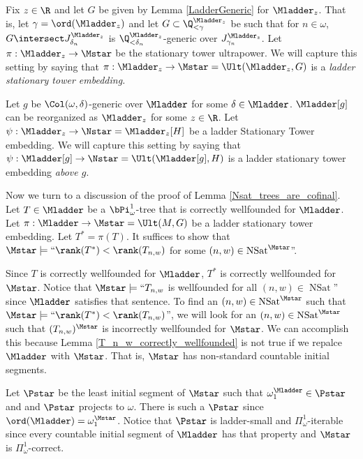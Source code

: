 \documentclass[oneside,12pt]{amsart}
\DeclareMathOperator{\NSat}{NSat}
\begin{document}
\begin{definition}
Fix $z\in\R$ and let $G$ be given by Lemma \ref{LadderGeneric} for $\Mladder_z$. That is,
let $\gamma=\ord(\Mladder_z)$ and let $G\subset \Q_{<\gamma}^{\Mladder_z}$ be such that for
$n\in\omega$, $G\intersect J^{\Mladder_z}_{\delta_n}$ is
$\Q_{<\delta_n}^{\Mladder_z}$-generic over $J^{\Mladder_z}_{\gamma_n}$.
Let $\pi:\Mladder_z\to\Mstar$ be the stationary tower ultrapower.
We will capture this setting by saying that  $\pi:\Mladder_z\to\Mstar=\Ult(\Mladder_z,G)$
is a \emph{ladder stationary tower embedding.}

Let $g$ be $\Col(\omega,\delta)$-generic over $\Mladder$ for some
$\delta\in\Mladder$.
$\Mladder[g]$ can be reorganized as $\Mladder_z$ for some $z\in\R$.
Let $\psi:\Mladder_z\to\Nstar=\Mladder_z[H]$ be a ladder Stationary Tower embedding.
We will capture this setting by saying that
$\psi:\Mladder[g]\to\Nstar=\Ult(\Mladder[g],H)$ is a ladder stationary tower embedding \emph{above $g$}.
\end{definition}

Now we turn to a discussion of the proof of Lemma \ref{Nsat_trees_are_cofinal}.
Let $T\in\Mladder$ be a $\bPi^1_{\omega}$-tree that is correctly wellfounded for $\Mladder$.
Let $\pi:\Mladder\to\Mstar=\Ult(M,G)$ be a ladder stationary tower embedding.
Let $T^* = \pi(T)$. It suffices to show that
$\Mstar\models\text{``}\rank(T^*) < \rank(T_{n,w})$ for some $(n,w)\in \NSat^{\Mstar}$''.

Since $T$ is correctly wellfounded for $\Mladder$, $T^*$ is correctly wellfounded for $\Mstar$.
Notice that $\Mstar\models\text{``}T_{n,w}$ is wellfounded for all $(n,w)\in \NSat$''
since $\Mladder$ satisfies that sentence. To find an $(n,w)\in \NSat^{\Mstar}$ such that
$\Mstar\models\text{``}\rank(T^*) < \rank(T_{n,w})$'', we will look for an
$(n,w)\in \NSat^{\Mstar}$
such that $(T_{n,w})^{\Mstar}$ is incorrectly wellfounded for $\Mstar$.
We can accomplish this because Lemma \ref{T_n_w_correctly_wellfounded} is not
true if we repalce $\Mladder$ with $\Mstar$. That is, $\Mstar$ has non-standard
countable initial segments.

Let $\Pstar$ be the least initial segment of $\Mstar$ such that
$\omega_1^{\Mladder}\in\Pstar$ and
and $\Pstar$ projects to $\omega$. There is such a $\Pstar$ since
$\ord(\Mladder)=\omega_1^{\Mstar}$. Notice that $\Pstar$ is ladder-small and
$\Pi^1_{\omega}$-iterable since every countable initial segment of $\Mladder$
has that property and $\Mstar$ is $\Pi^1_{\omega}$-correct.
\end{document}
